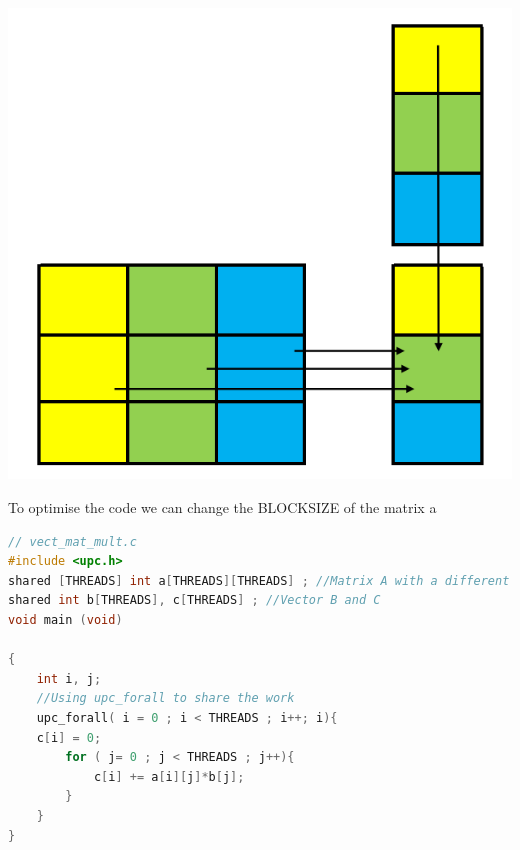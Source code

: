 \documentclass{report}
\begin{document}
\begin{center}
    \includegraphics[scale=0.5]{Images/Matrix_vector_unoptimized.png}
    \label{fig1}
\end{center}

To optimise the code we can change the BLOCKSIZE of the matrix a

\begin{lstlisting}[language=C]
// vect_mat_mult.c
#include <upc.h>
shared [THREADS] int a[THREADS][THREADS] ; //Matrix A with a different blocksize
shared int b[THREADS], c[THREADS] ; //Vector B and C
void main (void) 

{
    int i, j; 
    //Using upc_forall to share the work
    upc_forall( i = 0 ; i < THREADS ; i++; i){
    c[i] = 0;
        for ( j= 0 ; j < THREADS ; j++){
            c[i] += a[i][j]*b[j];
        }
    }
}
\end{lstlisting}
\end{document}
